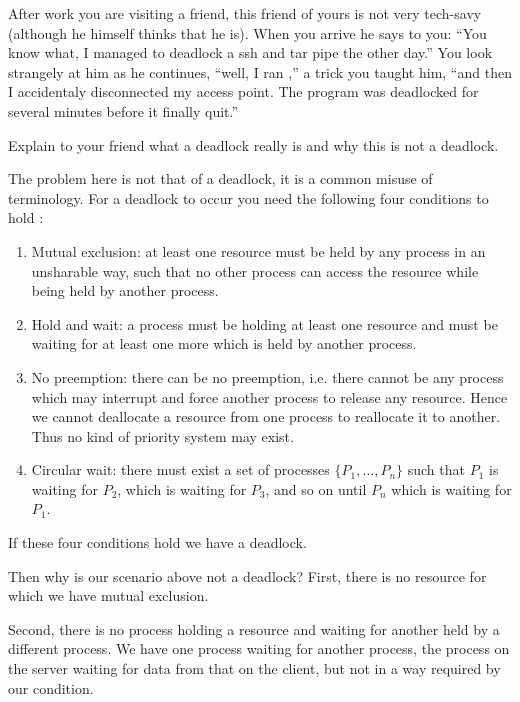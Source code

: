 \documentclass[addpoints,svv]{miunexam}
\begin{document}
\begin{questions}
  \question[3]\label{q:deadlock}
  After work you are visiting a friend, this friend of yours is not very 
  tech-savy (although he himself thinks that he is).
  When you arrive he says to you: ``You know what, I managed to deadlock a ssh 
  and tar pipe the other day.''
  You look strangely at him as he continues, ``well, I ran ,'' a trick you taught him, ``and then 
  I accidentaly disconnected my access point.  The program was deadlocked for 
  several minutes before it finally quit.''

  Explain to your friend what a deadlock really is and why this is not 
  a deadlock.

  \begin{solution}
    The problem here is not that of a deadlock, it is a common misuse of 
    terminology.
    For a deadlock to occur you need the following four conditions to hold 
    \cite[pp. 285--287]{Silberschatz2009osc}:
    \begin{enumerate}
      \item Mutual exclusion: at least one resource must be held by any process 
        in an unsharable way, such that no other process can access the 
        resource while being held by another process.
      \item Hold and wait: a process must be holding at least one resource and 
        must be waiting for at least one more which is held by another process.
      \item No preemption: there can be no preemption, i.e. there cannot be any 
        process which may interrupt and force another process to release any 
        resource.
        Hence we cannot deallocate a resource from one process to reallocate it 
        to another.
        Thus no kind of priority system may exist.
      \item Circular wait: there must exist a set of processes \(\{P_1, \ldots, 
        P_n\}\) such that \(P_1\) is waiting for \(P_2\), which is waiting for 
        \(P_3\), and so on until \(P_n\) which is waiting for \(P_1\).
    \end{enumerate}
    If these four conditions hold we have a deadlock.

    Then why is our scenario above not a deadlock?
    First, there is no resource for which we have mutual exclusion.

    Second, there is no process holding a resource and waiting for another held 
    by a different process.
    We have one process waiting for another process, the  process 
    on the server waiting for data from that on the client, but not in a way 
    required by our condition.


\end{solution}
\end{questions}
\end{document}
